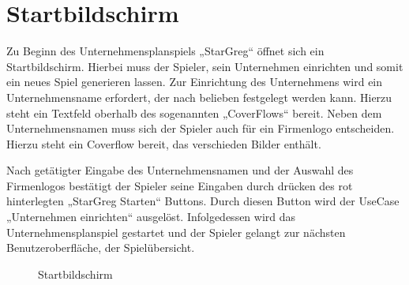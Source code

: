 \section{Startbildschirm}
\label{sec:ui-startbildschirm}

Zu Beginn des Unternehmensplanspiels „StarGreg“ öffnet sich ein Startbildschirm. Hierbei muss der Spieler, sein Unternehmen einrichten und somit ein neues Spiel generieren lassen. Zur Einrichtung des Unternehmens wird ein Unternehmensname erfordert, der nach belieben festgelegt werden kann. Hierzu steht ein Textfeld oberhalb des sogenannten „CoverFlows“ bereit. Neben dem Unternehmensnamen muss sich der Spieler auch für ein Firmenlogo entscheiden. Hierzu steht ein Coverflow bereit, das verschieden Bilder enthält.
 
Nach getätigter Eingabe des Unternehmensnamen und der Auswahl des Firmenlogos bestätigt der Spieler seine Eingaben durch drücken des rot hinterlegten „StarGreg Starten“ Buttons. Durch diesen Button wird der UseCase „Unternehmen einrichten“ ausgelöst. Infolgedessen wird das Unternehmensplanspiel gestartet und der Spieler gelangt zur nächsten Benutzeroberfläche, der Spielübersicht.

\begin{figure}[h]
  \centering
  \caption{Startbildschirm}
  \label{img:ui-startbildschirm}
\end{figure}

\autorende{}
 